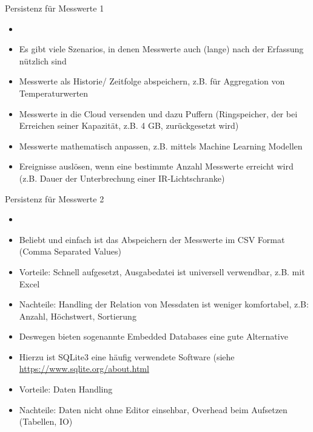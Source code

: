 \begin{frame}{Persistenz für Messwerte 1}
    \begin{itemize}
        \setlength{\itemindent}{1.9in}
        \item [\textbf{Warum Messwerte speichern? }]
    \end{itemize}

    \begin{itemize}
        \item Es gibt viele Szenarios, in denen Messwerte auch (lange) nach der Erfassung nützlich sind
        \item Messwerte als Historie/ Zeitfolge abspeichern, z.B. für Aggregation von Temperaturwerten
        \item Messwerte in die Cloud versenden und dazu Puffern (Ringspeicher, der bei Erreichen seiner Kapazität, z.B. 4 GB, zurückgesetzt wird)
        \item Messwerte mathematisch anpassen, z.B. mittels Machine Learning Modellen
        \item Ereignisse auslösen, wenn eine bestimmte Anzahl Messwerte erreicht wird (z.B. Dauer der Unterbrechung einer IR-Lichtschranke)
     \end{itemize}
\end{frame}


\begin{frame}{Persistenz für Messwerte 2}
    \begin{itemize}
        \setlength{\itemindent}{1.9in}
        \item [\textbf{Welche Möglichkeiten gibt es? }]
    \end{itemize}

    \begin{itemize}
        \item Beliebt und einfach ist das Abspeichern der Messwerte im CSV Format (Comma Separated Values)
        \item Vorteile: Schnell aufgesetzt, Ausgabedatei ist universell verwendbar, z.B. mit Excel
        \item Nachteile: Handling der Relation von Messdaten ist weniger komfortabel, z.B:  Anzahl, Höchstwert, Sortierung
        \item Deswegen bieten sogenannte Embedded Databases eine gute Alternative
        \item Hierzu ist SQLite3 eine häufig verwendete Software (siehe \url{https://www.sqlite.org/about.html}
        \item Vorteile: Daten Handling
        \item Nachteile: Daten nicht ohne Editor einsehbar, Overhead beim Aufsetzen (Tabellen, IO)
     \end{itemize}
\end{frame}

